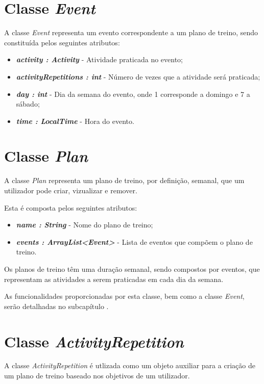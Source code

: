 \documentclass[a4paper,12pt]{scrreprt}
\begin{document}
\section{Classe \textit{Event}}
    A classe \textit{Event} representa um evento correspondente a um plano de treino, sendo constituída pelos seguintes atributos:

    \begin{itemize}
        \item \textit{\textbf{activity : Activity}} - Atividade praticada no evento;
        \item \textit{\textbf{activityRepetitions : int}} - Número de vezes que a atividade será praticada;
        \item \textit{\textbf{day : int}} - Dia da semana do evento, onde 1 corresponde a domingo e 7 a sábado;
        \item \textit{\textbf{time : LocalTime}} - Hora do evento.
    \end{itemize}

\section{Classe \textit{Plan}}
    A classe \textit{Plan} representa um plano de treino, por definição, semanal, que um utilizador pode criar, vizualizar e remover.

    Esta é composta pelos seguintes atributos:
    \begin{itemize}
        \item \textit{\textbf{name : String}} - Nome do plano de treino;
        \item \textit{\textbf{events : ArrayList<Event>}} - Lista de eventos que compõem o plano de treino.
    \end{itemize}

    Os planos de treino têm uma duração semanal, sendo compostos por eventos, que representam as atividades a serem praticadas em cada dia da semana.

    As funcionalidades proporcionadas por esta classe, bem como a classe \textit{Event}, serão detalhadas no subcapítulo \textit{}.

\section{Classe \textit{ActivityRepetition}}
    A classe \textit{ActivityRepetition} é utlizada como um objeto auxiliar para a criação de um plano de treino baseado nos objetivos de um utilizador.
\end{document}
